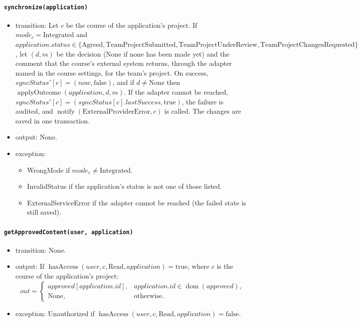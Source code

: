 \documentclass[12pt, titlepage]{article}
\begin{document}
\paragraph{\texttt{synchronize(application)}}
\begin{itemize}
    \item transition: Let $c$ be the course of the application's project. If $\mathit{mode}_c=\text{Integrated}$ and $application.status\in\{\text{Agreed},\text{TeamProjectSubmitted},\text{TeamProjectUnderReview},\text{TeamProjectChangesRequested}\}$, let $(d,m)$ be the decision (None if none has been made yet) and the comment that the course's external system returns, through the adapter named in the course settings, for the team's project. On success, $\mathit{syncStatus}'[c]=(\mathit{now},\text{false})$, and if $d\ne\text{None}$ then $\operatorname{applyOutcome}(application,d,m)$. If the adapter cannot be reached, $\mathit{syncStatus}'[c]=(\mathit{syncStatus}[c].lastSuccess,\text{true})$, the failure is audited, and $\operatorname{notify}(\text{ExternalProviderError},c)$ is called. The changes are saved in one transaction.
    \item output: None.
    \item exception:
    \begin{itemize}
        \item WrongMode if $\mathit{mode}_c\ne\text{Integrated}$.
        \item InvalidStatus if the application's status is not one of those listed.
        \item ExternalServiceError if the adapter cannot be reached (the failed state is still saved).
    \end{itemize}
\end{itemize}

\paragraph{\texttt{getApprovedContent(user, application)}}
\begin{itemize}
    \item transition: None.
    \item output: If $\operatorname{hasAccess}(user,c,\text{Read},application)=\text{true}$, where $c$ is the course of the application's project:
    \[
    out=
    \begin{cases}
        \mathit{approved}[application.id], & application.id\in\operatorname{dom}(\mathit{approved}),\\
        \text{None}, & \text{otherwise}.
    \end{cases}
    \]
    \item exception: Unauthorized if $\operatorname{hasAccess}(user,c,\text{Read},application)=\text{false}$.
\end{itemize}
\end{document}
